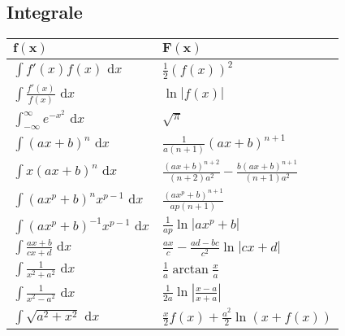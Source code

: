 \documentclass[a4paper,10pt]{article}
\def\dx{\text{ d}x}
\begin{document}
\subsection{Integrale}
\begin{center}
    \begin{tabularx}{\linewidth}{>{\centering\arraybackslash}X>{\centering\arraybackslash}X}
        \toprule
        $\mathbf{f(x)}$                      & $\mathbf{F(x)}$                                                  \\
        \midrule
        $\int f'(x) f(x) \dx$                & $\frac{1}{2}(f(x))^2$                                            \\
        $\int \frac{f'(x)}{f(x)} \dx$        & $\ln|f(x)|$                                                      \\
        $\int_{-\infty}^\infty e^{-x^2} \dx$ & $\sqrt{\pi}$                                                     \\
        $\int (ax+b)^n \dx$                  & $\frac{1}{a(n+1)}(ax+b)^{n+1}$                                   \\
        $\int x(ax+b)^n \dx$                 & $\frac{(ax+b)^{n+2}}{(n+2)a^2} - \frac{b(ax+b)^{n+1}}{(n+1)a^2}$ \\
        $\int (ax^p+b)^n x^{p-1} \dx$        & $\frac{(ax^p+b)^{n+1}}{ap(n+1)}$                                 \\
        $\int (ax^p + b)^{-1} x^{p-1} \dx$   & $\frac{1}{ap} \ln |ax^p + b|$                                    \\
        $\int \frac{ax+b}{cx+d} \dx$         & $\frac{ax}{c} - \frac{ad-bc}{c^2} \ln |cx +d|$                   \\
        $\int \frac{1}{x^2+a^2} \dx$         & $\frac{1}{a} \arctan \frac{x}{a}$                                \\
        $\int \frac{1}{x^2 - a^2} \dx$       & $\frac{1}{2a} \ln\left| \frac{x-a}{x+a} \right|$                 \\
        $\int \sqrt{a^2+x^2} \dx $           & $\frac{x}{2}f(x) + \frac{a^2}{2}\ln(x+f(x))$                     \\
        \bottomrule
    \end{tabularx}
\end{center}
\end{document}
